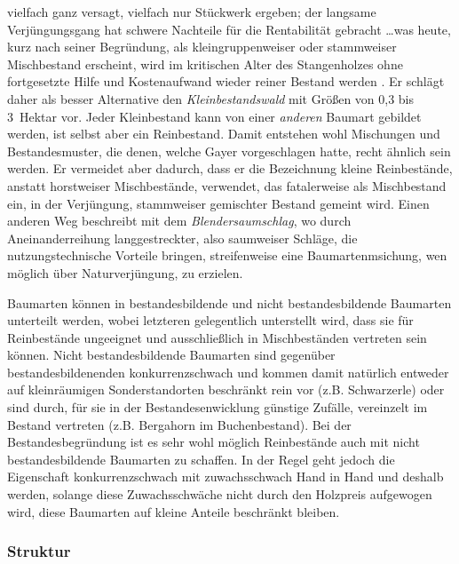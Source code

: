 \documentclass[twocolumn]{scrartcl}
\begin{document}
vielfach ganz versagt, vielfach nur Stückwerk ergeben; der langsame
Verjüngungsgang hat schwere Nachteile für die Rentabilität gebracht
\dots was heute, kurz nach seiner Begründung, als kleingruppenweiser
oder stammweiser Mischbestand erscheint, wird im kritischen Alter des
Stangenholzes ohne fortgesetzte Hilfe und Kostenaufwand wieder reiner
Bestand werden\flqq{}
\citep[S.~547]{mayr1909WaldbauAufNaturgesetzlicherGrundlage}. Er
schlägt daher als besser Alternative den \emph{Kleinbestandswald} mit
Größen von 0,3 bis 3~Hektar vor. Jeder Kleinbestand kann von einer
\emph{anderen} Baumart gebildet werden, ist selbst aber ein
Reinbestand. Damit entstehen wohl Mischungen und Bestandesmuster, die
denen, welche Gayer vorgeschlagen hatte, recht ähnlich sein werden. Er
vermeidet aber dadurch, dass er die Bezeichnung kleine Reinbestände,
anstatt horstweiser Mischbestände, verwendet, das fatalerweise als
Mischbestand ein, in der Verjüngung, stammweiser gemischter Bestand
gemeint wird. Einen anderen Weg beschreibt
\cite{wagner1923DerBlendersaumschlagUndSeinSystem} mit dem
\emph{Blendersaumschlag}, wo durch Aneinanderreihung langgestreckter,
also saumweiser Schläge, die nutzungstechnische Vorteile bringen,
streifenweise eine Baumartenmsichung, wen möglich über
Naturverjüngung, zu erzielen.

Baumarten können in bestandesbildende und nicht bestandesbildende
Baumarten unterteilt werden, wobei letzteren gelegentlich unterstellt
wird, dass sie für Reinbestände ungeeignet und ausschließlich in
Mischbeständen vertreten sein können. Nicht bestandesbildende
Baumarten sind gegenüber bestandesbildenenden konkurrenzschwach und
kommen damit natürlich entweder auf kleinräumigen Sonderstandorten
beschränkt rein vor (z.B. Schwarzerle) oder sind durch, für sie in der
Bestandesenwicklung günstige Zufälle, vereinzelt im Bestand vertreten
(z.B. Bergahorn im Buchenbestand). Bei der Bestandesbegründung ist es
sehr wohl möglich Reinbestände auch mit nicht bestandesbildende
Baumarten zu schaffen. In der Regel geht jedoch die Eigenschaft
konkurrenzschwach mit zuwachsschwach Hand in Hand und deshalb werden,
solange diese Zuwachsschwäche nicht durch den Holzpreis aufgewogen
wird, diese Baumarten auf kleine Anteile beschränkt bleiben.

\subsubsection{Struktur}
\label{sssec:struktur}
\end{document}
